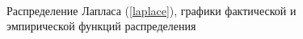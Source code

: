 \documentclass[12pt,a4paper]{article}
\begin{document}
{\begin{figure}[htp]
\begin{minipage}[h]{0.3\linewidth}
						\\
					\end{minipage}
					\caption{Распределение Лапласа (\ref{laplace}), графики фактической и эмпирической функций распределения}
					\label{ris:laplace_cum}
				\end{figure}
			}
		
\end{document}
